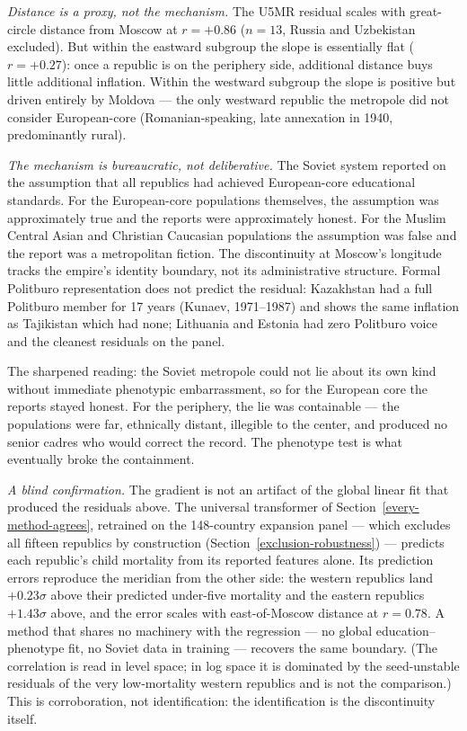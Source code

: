 \documentclass[12pt,letterpaper]{article}
\begin{document}
\textit{Distance is a proxy, not the mechanism.} The U5MR residual
scales with great-circle distance from Moscow at $r = +0.86$
($n = 13$, Russia and Uzbekistan excluded). But within the eastward
subgroup the slope is
essentially flat ($r = +0.27$): once a republic is on the periphery
side, additional distance buys little additional inflation. Within
the westward subgroup the slope is positive but driven entirely by
Moldova --- the only westward republic the metropole did not consider
European-core (Romanian-speaking, late annexation in 1940,
predominantly rural).

\textit{The mechanism is bureaucratic, not deliberative.} The Soviet
system reported on the assumption that all republics had achieved
European-core educational standards. For the European-core
populations themselves, the assumption was approximately true and the
reports were approximately honest. For the Muslim Central Asian and
Christian Caucasian populations the assumption was false and the
report was a metropolitan fiction. The discontinuity at Moscow's
longitude tracks the empire's identity boundary, not its
administrative structure. Formal Politburo representation does not
predict the residual: Kazakhstan had a full Politburo member for
17 years (Kunaev, 1971--1987) and shows the same inflation as
Tajikistan which had none; Lithuania and Estonia had zero Politburo
voice and the cleanest residuals on the panel.

The sharpened reading: the Soviet metropole could not lie about its
own kind without immediate phenotypic embarrassment, so for the
European core the reports stayed honest. For the periphery, the lie
was containable --- the populations were far, ethnically distant,
illegible to the center, and produced no senior cadres who would
correct the record. The phenotype test is what eventually broke the
containment.

\textit{A blind confirmation.} The gradient is not an artifact of the
global linear fit that produced the residuals above. The universal
transformer of Section~\ref{every-method-agrees}, retrained on the
148-country expansion panel --- which excludes all fifteen republics by
construction (Section~\ref{exclusion-robustness}) --- predicts each
republic's child mortality from its reported features
alone. Its prediction errors reproduce the meridian from the other
side: the western republics land $+0.23\sigma$ above their predicted
under-five mortality and the eastern republics $+1.43\sigma$ above, and
the error scales with east-of-Moscow distance at $r = 0.78$. A method
that shares no machinery with the regression --- no global
education--phenotype fit, no Soviet data in training --- recovers the
same boundary. (The correlation is read in level space; in log space it
is dominated by the seed-unstable residuals of the very low-mortality
western republics and is not the comparison.) This is corroboration,
not identification: the identification is the discontinuity itself.
\end{document}
